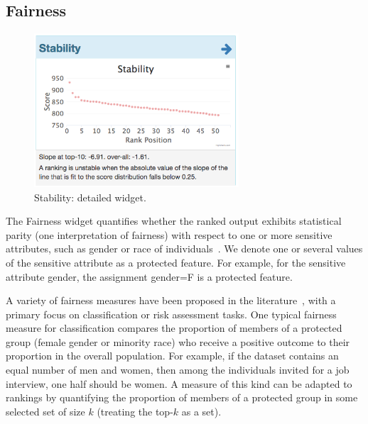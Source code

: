 

\subsection{Fairness}
\label{sec:sys:fair}

\begin{figure}[t!]	
\centering
\includegraphics[width=3in]{figs/stability.png}
     \caption{{\sf Stability}: detailed widget.}
     \label{fig:stability}
\end{figure}

The {\sf Fairness} widget quantifies whether the ranked output exhibits statistical parity (one interpretation of fairness) with respect to one or more sensitive attributes, such as gender or race of individuals~\cite{DBLP:conf/ssdbm/YangS17}.  We denote one or several values of the sensitive attribute as a protected feature.  For example, for the sensitive attribute {\sf gender}, the assignment {\sf gender=F} is a protected feature.

A variety of fairness measures have been proposed in the literature~\cite{DBLP:journals/datamine/Zliobaite17}, with a primary focus on classification or risk assessment tasks. One typical fairness measure for classification compares the proportion of members of a protected group (\eg female gender or minority race) who receive a positive outcome to their proportion in the overall population.  For example, if the dataset contains an equal number of men and women, then among the individuals invited for a job interview, one half should be women.  A measure of this kind can be adapted to rankings by quantifying the proportion of members of a protected group in some selected set of size $k$ (treating the top-$k$ as a set).

